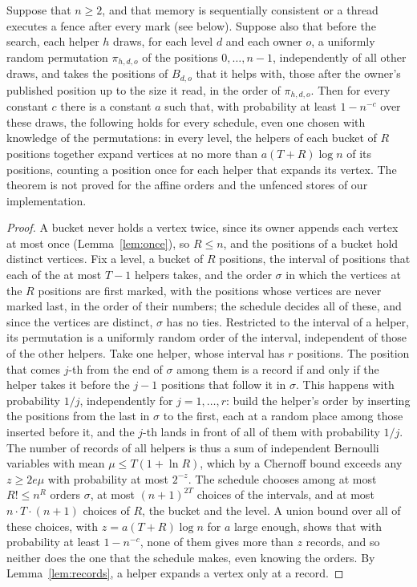 \begin{theorem}
\label{thm:records}
Suppose that $n \geq 2$, and that memory is sequentially consistent or a thread executes a fence after every mark (see below). Suppose also that before the search, each helper $h$ draws, for each level $d$ and each owner $o$, a uniformly random permutation $\pi_{h,d,o}$ of the positions $0, \ldots, n-1$, independently of all other draws, and takes the positions of $B_{d,o}$ that it helps with, those after the owner's published position up to the size it read, in the order of $\pi_{h,d,o}$. Then for every constant $c$ there is a constant $a$ such that, with probability at least $1 - n^{-c}$ over these draws, the following holds for every schedule, even one chosen with knowledge of the permutations: in every level, the helpers of each bucket of $R$ positions together expand vertices at no more than $a (T + R) \log n$ of its positions, counting a position once for each helper that expands its vertex. The theorem is not proved for the affine orders and the unfenced stores of our implementation.
\end{theorem}
\begin{proof}
A bucket never holds a vertex twice, since its owner appends each vertex at most once (Lemma~\ref{lem:once}), so $R \leq n$, and the positions of a bucket hold distinct vertices. Fix a level, a bucket of $R$ positions, the interval of positions that each of the at most $T-1$ helpers takes, and the order $\sigma$ in which the vertices at the $R$ positions are first marked, with the positions whose vertices are never marked last, in the order of their numbers; the schedule decides all of these, and since the vertices are distinct, $\sigma$ has no ties. Restricted to the interval of a helper, its permutation is a uniformly random order of the interval, independent of those of the other helpers. Take one helper, whose interval has $r$ positions. The position that comes $j$-th from the end of $\sigma$ among them is a record if and only if the helper takes it before the $j-1$ positions that follow it in $\sigma$. This happens with probability $1/j$, independently for $j = 1, \ldots, r$: build the helper's order by inserting the positions from the last in $\sigma$ to the first, each at a random place among those inserted before it, and the $j$-th lands in front of all of them with probability $1/j$. The number of records of all helpers is thus a sum of independent Bernoulli variables with mean $\mu \leq T(1 + \ln R)$, which by a Chernoff bound exceeds any $z \geq 2e\mu$ with probability at most $2^{-z}$. The schedule chooses among at most $R! \leq n^R$ orders $\sigma$, at most $(n+1)^{2T}$ choices of the intervals, and at most $n \cdot T \cdot (n+1)$ choices of $R$, the bucket and the level. A union bound over all of these choices, with $z = a(T + R)\log n$ for $a$ large enough, shows that with probability at least $1 - n^{-c}$, none of them gives more than $z$ records, and so neither does the one that the schedule makes, even knowing the orders. By Lemma~\ref{lem:records}, a helper expands a vertex only at a record.
\end{proof}

